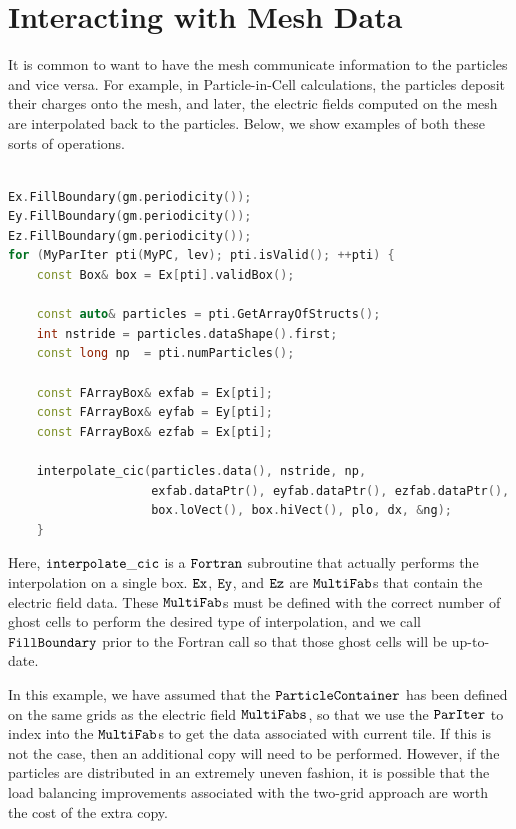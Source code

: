 \section{Interacting with Mesh Data}
\label{sec:Particles:Interacting}

It is common to want to have the mesh communicate information to the particles and vice versa. For example, in Particle-in-Cell calculations, the particles deposit their charges onto the mesh, and later, the electric fields computed on the mesh are interpolated back to the particles. Below, we show examples of both these sorts of operations.

\begin{lstlisting}[language=cpp]

Ex.FillBoundary(gm.periodicity());
Ey.FillBoundary(gm.periodicity());
Ez.FillBoundary(gm.periodicity());
for (MyParIter pti(MyPC, lev); pti.isValid(); ++pti) {
    const Box& box = Ex[pti].validBox();

    const auto& particles = pti.GetArrayOfStructs();
    int nstride = particles.dataShape().first;
    const long np  = pti.numParticles();

    const FArrayBox& exfab = Ex[pti];
    const FArrayBox& eyfab = Ey[pti];
    const FArrayBox& ezfab = Ex[pti];

    interpolate_cic(particles.data(), nstride, np,
                    exfab.dataPtr(), eyfab.dataPtr(), ezfab.dataPtr(),
                    box.loVect(), box.hiVect(), plo, dx, &ng);
    }

\end{lstlisting}

Here, $\tt{interpolate\_cic}$ is a $\tt{Fortran}$ subroutine that actually performs the interpolation on a single box. $\tt{Ex}$, $\tt{Ey}$, and $\tt{Ez}$ are $\tt{MultiFab}$s
that contain the electric field data. These $\tt{MultiFab}$s must be defined with the correct number of ghost cells to perform the desired type of interpolation,
and we call $\tt{FillBoundary}$ prior to the Fortran call so that those ghost cells will be up-to-date. 

In this example, we have assumed that the $\tt{ParticleContainer}$ has been defined on the same grids as the electric field $\tt{MultiFabs}$, so that we use the $\tt{ParIter}$ to index into the $\tt{MultiFab}$s to get the data associated with current tile. If this is not the case, then an additional copy will need to be performed. However, if the particles are distributed in an extremely uneven fashion, it is possible that the load balancing improvements associated with the two-grid approach are worth the cost of the extra copy.

